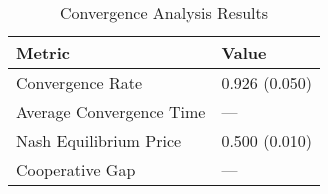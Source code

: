 \begin{table}[htbp]
\centering
\caption{Convergence Analysis Results}
\label{tab:convergence}
\begin{tabular}{ll}
\toprule
Metric & Value \\
\midrule
Convergence Rate & 0.926 (0.050) \\
Average Convergence Time & — \\
Nash Equilibrium Price & 0.500 (0.010) \\
Cooperative Gap & — \\
\bottomrule
\end{tabular}
\end{table}